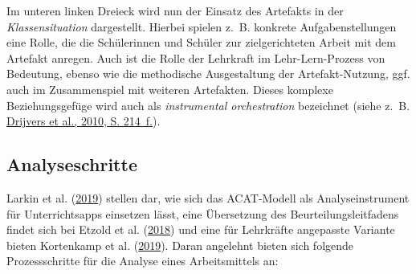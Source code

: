 \documentclass[
]{scrbook}
\theoremstyle{definition}
\theoremstyle{definition}
\theoremstyle{definition}
\theoremstyle{definition}
\theoremstyle{remark}
\begin{document}
Im unteren linken Dreieck wird nun der Einsatz des Artefakts in der \emph{Klassensituation} dargestellt. Hierbei spielen z.~B. konkrete Aufgabenstellungen eine Rolle, die die Schülerinnen und Schüler zur zielgerichteten Arbeit mit dem Artefakt anregen. Auch ist die Rolle der Lehrkraft im Lehr-Lern-Prozess von Bedeutung, ebenso wie die methodische Ausgestaltung der Artefakt-Nutzung, ggf. auch im Zusammenspiel mit weiteren Artefakten. Dieses komplexe Beziehungsgefüge wird auch als \emph{instrumental orchestration} bezeichnet (siehe z.~B. \protect\hyperlink{ref-Drijvers2010}{Drijvers et al., 2010, S. 214~f.}).

\hypertarget{analyseschritte}{%
\subsection{Analyseschritte}\label{analyseschritte}}

Larkin et al. (\protect\hyperlink{ref-Larkin2019}{2019}) stellen dar, wie sich das ACAT-Modell als Analyseinstrument für Unterrichtsapps einsetzen lässt, eine Übersetzung des Beurteilungsleitfadens findet sich bei Etzold et al. (\protect\hyperlink{ref-Etzold2018}{2018}) und eine für Lehrkräfte angepasste Variante bieten Kortenkamp et al. (\protect\hyperlink{ref-Kortenkamp2019}{2019}). Daran angelehnt bieten sich folgende Prozessschritte für die Analyse eines Arbeitsmittels an:
\end{document}
